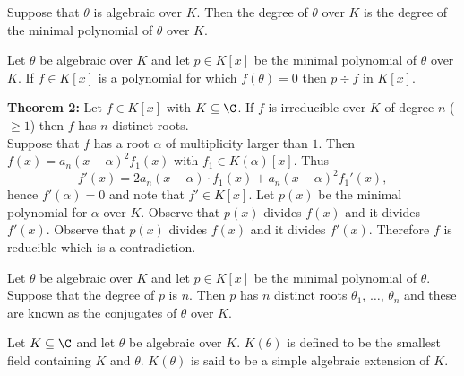  Suppose that $\theta$ is algebraic over $K$.  Then the degree of $\theta$ over $K$ is the degree of the minimal polynomial of $\theta$ over $K$.

\remark Let $\theta$ be algebraic over $K$ and let $p\in K[x]$ be the minimal polynomial of $\theta$ over $K$.  If $f\in K[x]$ is a polynomial for which $f(\theta)=0$ then $p\div f$ in $K[x]$.

\textbf{Theorem 2:} Let $f\in K[x]$ with $K\subseteq\C$.  If $f$ is irreducible over $K$ of degree $n$ ($\geq1$) then $f$ has $n$ distinct roots. \\
\pf Suppose that $f$ has a root $\alpha$ of multiplicity larger than $1$.  Then $f(x)=a_n(x-\alpha)^2f_1(x)$ with $f_1\in K(\alpha)[x]$.  Thus
\[ f'(x) = 2a_n(x-\alpha)\cdot f_1(x) + a_n(x-\alpha)^2 f_1'(x) , \]
hence $f'(\alpha)=0$ and note that $f'\in K[x]$.  Let $p(x)$ be the minimal polynomial for $\alpha$ over $K$.  Observe that $p(x)$ divides $f(x)$ and it divides $f'(x)$.  Observe that $p(x)$ divides $f(x)$ and it divides $f'(x)$.  Therefore $f$ is reducible which is a contradiction.

Let $\theta$ be algebraic over $K$ and let $p\in K[x]$ be the minimal polynomial of $\theta$.  Suppose that the degree of $p$ is $n$.  Then $p$ has $n$ distinct roots $\theta_1$, $\dotsc$, $\theta_n$ and these are known as the conjugates of $\theta$ over $K$.

 Let $K\subseteq\C$ and let $\theta$ be algebraic over $K$.  $K(\theta)$ is defined to be the smallest field containing $K$ and $\theta$.  $K(\theta)$ is said to be a simple algebraic extension of $K$.